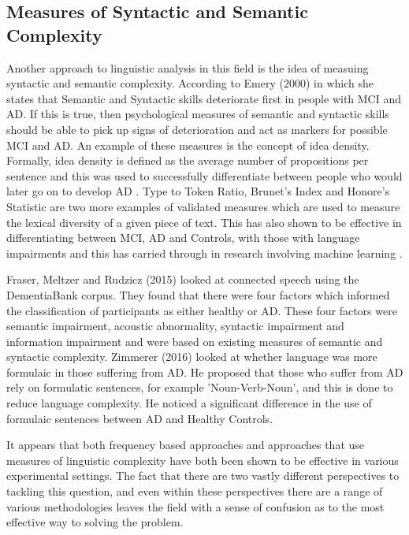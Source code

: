\documentclass[a4paper]{article}
\begin{document}
\subsection{Measures of Syntactic and Semantic Complexity}
Another approach to linguistic analysis in this field is the idea of measuing syntactic and semantic complexity. According to Emery (2000) \cite{Emery2000} in which she states that Semantic and Syntactic skills deteriorate first in people with MCI and AD. If this is true, then psychological measures of semantic and syntactic skills should be able to pick up signs of deterioration and act as markers for possible MCI and AD. An example of these measures is the concept of idea density. Formally, idea density is defined as the average number of propositions per sentence \cite{Kintsch1973} and this was used to successfully differentiate between people who would later go on to develop AD \cite{Snowdon1996}. Type to Token Ratio, Brunet's Index and Honore's Statistic are two more examples of validated measures which are used to measure the lexical diversity of a given piece of text. This has also shown to be effective in differentiating between MCI, AD and Controls, with those with language impairments \cite{Bucks2000} and this has carried through in research involving machine learning \cite{Wang2016, Thomas2005}.  \newline
\par
Fraser, Meltzer and Rudzicz (2015) \cite{Fraser2015} looked at connected speech using the DementiaBank corpus. They found that there were four factors which informed the classification of participants as either healthy or AD. These four factors were semantic impairment, acoustic abnormality, syntactic impairment and information impairment and were based on existing measures of semantic and syntactic complexity. Zimmerer (2016) \cite{Zimmerer2016} looked at whether language was more formulaic in those suffering from AD. He proposed that those who suffer from AD rely on formulatic sentences, for example 'Noun-Verb-Noun', and this is done to reduce language complexity. He noticed a significant difference in the use of formulaic sentences between AD and Healthy Controls. \newline
\par
It appears that both frequency based approaches and approaches that use measures of linguistic complexity have both been shown to be effective in various experimental settings. The fact that there are two vastly different perspectives to tackling this question, and even within these perspectives there are a range of various methodologies leaves the field with a sense of confusion as to the most effective way to solving the problem. \newline
\par
\end{document}
